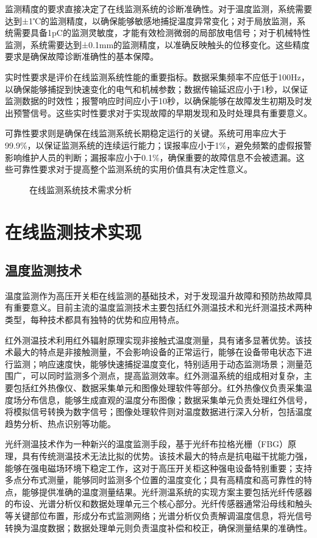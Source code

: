 监测精度的要求直接决定了在线监测系统的诊断准确性。对于温度监测，系统需要达到±1℃的监测精度，以确保能够敏感地捕捉温度异常变化；对于局放监测，系统需要具备1pC的监测灵敏度，才能有效检测微弱的局部放电信号；对于机械特性监测，系统需要达到±0.1mm的监测精度，以准确反映触头的位移变化。这些精度要求是确保故障诊断准确性的基本保障。

实时性要求是评价在线监测系统性能的重要指标。数据采集频率不应低于100Hz，以确保能够捕捉到快速变化的电气和机械参数；数据传输延迟应小于1秒，以保证监测数据的时效性；报警响应时间应小于10秒，以确保能够在故障发生初期及时发出预警信号。这些实时性要求对于实现故障的早期发现和及时处理具有重要意义。

可靠性要求则是确保在线监测系统长期稳定运行的关键。系统可用率应大于99.9\%，以保证监测系统的连续运行能力；误报率应小于1\%，避免频繁的虚假报警影响维护人员的判断；漏报率应小于0.1\%，确保重要的故障信息不会被遗漏。这些可靠性要求对于提高整个监测系统的实用价值具有决定性意义。

\begin{figure}[h]
\centering
\caption{在线监测系统技术需求分析}
\label{fig:monitoring_requirements}
\end{figure}

\section{在线监测技术实现}

\subsection{温度监测技术}

温度监测作为高压开关柜在线监测的基础技术，对于发现温升故障和预防热故障具有重要意义。目前主流的温度监测技术主要包括红外测温技术和光纤测温技术两种类型，每种技术都具有独特的优势和应用特点。

红外测温技术利用红外辐射原理实现非接触式温度测量，具有诸多显著优势。该技术最大的特点是非接触测量，不会影响设备的正常运行，能够在设备带电状态下进行监测；响应速度快，能够快速捕捉温度变化，特别适用于动态监测场景；测量范围广，可以同时监测多个测点，提高监测效率。红外测温系统的组成相对复杂，主要包括红外热像仪、数据采集单元和图像处理软件等部分。红外热像仪负责采集温度场分布信息，能够生成直观的温度分布图像；数据采集单元负责处理红外信号，将模拟信号转换为数字信号；图像处理软件则对温度数据进行深入分析，包括温度趋势分析、热点识别等功能。

光纤测温技术作为一种新兴的温度监测手段，基于光纤布拉格光栅（FBG）原理，具有传统测温技术无法比拟的优势。该技术最大的特点是抗电磁干扰能力强，能够在强电磁场环境下稳定工作，这对于高压开关柜这种强电设备特别重要；支持多点分布式测量，能够同时监测多个位置的温度变化；具有高精度和高可靠性的特点，能够提供准确的温度测量结果。光纤测温系统的实现方案主要包括光纤传感器的布设、光谱分析仪和数据处理单元三个核心部分。光纤传感器通常沿母线和触头等关键部位布置，形成分布式监测网络；光谱分析仪负责解调温度信息，将光信号转换为温度数据；数据处理单元则负责温度补偿和校正，确保测量结果的准确性。

